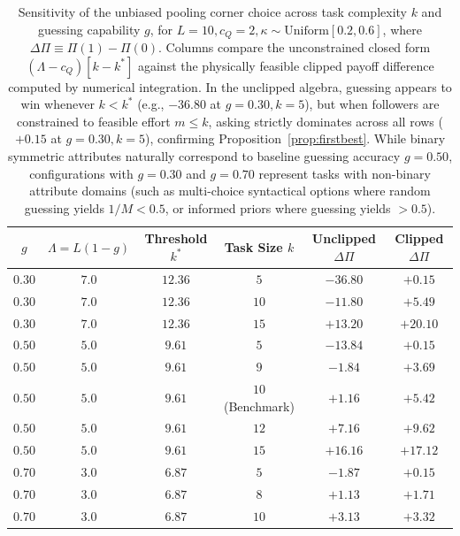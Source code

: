 \documentclass[11pt]{article}
\begin{document}
\begin{table}[ht]
\centering
\small
\setlength{\tabcolsep}{4.5pt}
\begin{tabular}{cccccc}
\toprule
$g$ & $\Lambda = L(1-g)$ & Threshold $k^*$ & Task Size $k$ & Unclipped $\Delta\Pi$ & Clipped $\Delta\Pi$ \\
\midrule
$0.30$ & $7.0$ & $12.36$ & $5$ & $-36.80$ & $+0.15$ \\
$0.30$ & $7.0$ & $12.36$ & $10$ & $-11.80$ & $+5.49$ \\
$0.30$ & $7.0$ & $12.36$ & $15$ & $+13.20$ & $+20.10$ \\
\midrule
$0.50$ & $5.0$ & $9.61$ & $5$ & $-13.84$ & $+0.15$ \\
$0.50$ & $5.0$ & $9.61$ & $9$ & $-1.84$ & $+3.69$ \\
$0.50$ & $5.0$ & $9.61$ & $10$ (Benchmark) & $+1.16$ & $+5.42$ \\
$0.50$ & $5.0$ & $9.61$ & $12$ & $+7.16$ & $+9.62$ \\
$0.50$ & $5.0$ & $9.61$ & $15$ & $+16.16$ & $+17.12$ \\
\midrule
$0.70$ & $3.0$ & $6.87$ & $5$ & $-1.87$ & $+0.15$ \\
$0.70$ & $3.0$ & $6.87$ & $8$ & $+1.13$ & $+1.71$ \\
$0.70$ & $3.0$ & $6.87$ & $10$ & $+3.13$ & $+3.32$ \\
\bottomrule
\end{tabular}
\caption{Sensitivity of the unbiased pooling corner choice across task complexity $k$ and guessing capability $g$, for $L=10, c_Q=2, \kappa \sim \text{Uniform}[0.2, 0.6]$, where $\Delta\Pi \equiv \Pi(1) - \Pi(0)$. Columns compare the unconstrained closed form $(\Lambda - c_Q)[k - k^*]$ against the physically feasible clipped payoff difference computed by numerical integration. In the unclipped algebra, guessing appears to win whenever $k < k^*$ (e.g., $-36.80$ at $g=0.30, k=5$), but when followers are constrained to feasible effort $m \le k$, asking strictly dominates across all rows ($+0.15$ at $g=0.30, k=5$), confirming Proposition~\ref{prop:firstbest}. While binary symmetric attributes naturally correspond to baseline guessing accuracy $g = 0.50$, configurations with $g = 0.30$ and $g = 0.70$ represent tasks with non-binary attribute domains (such as multi-choice syntactical options where random guessing yields $1/M < 0.5$, or informed priors where guessing yields $> 0.5$).}
\label{tab:unbiased_sensitivity}
\end{table}
\end{document}
